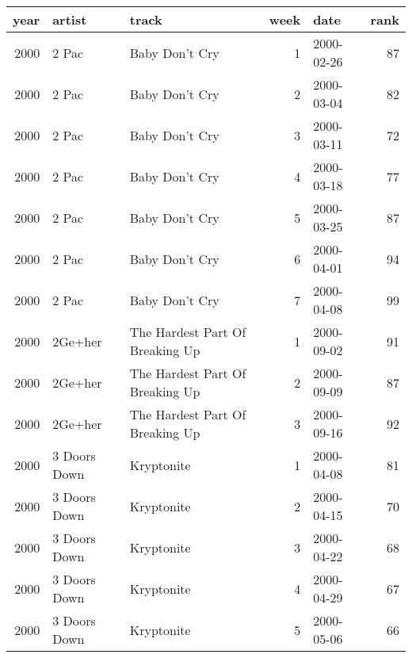 \begin{tabular}{rllrlr}
  \toprule
 year & artist & track & week & date & rank \\ 
  \midrule
  2000 & 2 Pac & Baby Don't Cry &   1 & 2000-02-26 &  87 \\ 
  2000 & 2 Pac & Baby Don't Cry &   2 & 2000-03-04 &  82 \\ 
  2000 & 2 Pac & Baby Don't Cry &   3 & 2000-03-11 &  72 \\ 
  2000 & 2 Pac & Baby Don't Cry &   4 & 2000-03-18 &  77 \\ 
  2000 & 2 Pac & Baby Don't Cry &   5 & 2000-03-25 &  87 \\ 
  2000 & 2 Pac & Baby Don't Cry &   6 & 2000-04-01 &  94 \\ 
  2000 & 2 Pac & Baby Don't Cry &   7 & 2000-04-08 &  99 \\ 
  2000 & 2Ge+her & The Hardest Part Of Breaking Up &   1 & 2000-09-02 &  91 \\ 
  2000 & 2Ge+her & The Hardest Part Of Breaking Up &   2 & 2000-09-09 &  87 \\ 
  2000 & 2Ge+her & The Hardest Part Of Breaking Up &   3 & 2000-09-16 &  92 \\ 
  2000 & 3 Doors Down & Kryptonite &   1 & 2000-04-08 &  81 \\ 
  2000 & 3 Doors Down & Kryptonite &   2 & 2000-04-15 &  70 \\ 
  2000 & 3 Doors Down & Kryptonite &   3 & 2000-04-22 &  68 \\ 
  2000 & 3 Doors Down & Kryptonite &   4 & 2000-04-29 &  67 \\ 
  2000 & 3 Doors Down & Kryptonite &   5 & 2000-05-06 &  66 \\ 
   \bottomrule
\end{tabular}
